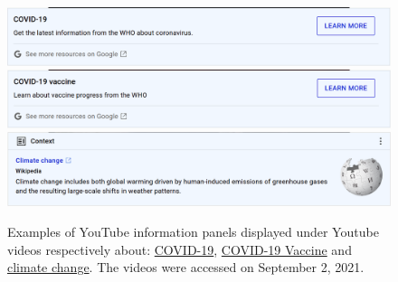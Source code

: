 \documentclass{article}
\begin{document}
\begin{figure}[h]
	\centering
		\includegraphics[scale=0.2]{./img/youtube_panels/youtube_panel_covid.png} 
		\includegraphics[scale=0.2]{./img/youtube_panels/youtube_panel_covid_vaccine.png} 
		\includegraphics[scale=0.2]{./img/youtube_panels/youtube_panel_climate.png}
	\caption{Examples of YouTube information panels displayed under Youtube videos respectively about: \href{https://www.youtube.com/watch?v=O1cFVdC2rZQ}{COVID-19}, \href{https://www.youtube.com/watch?v=v0-6JTr2Ifo}{COVID-19 Vaccine} and \href{https://www.youtube.com/watch?v=4U8kgiiVj5Q}{climate change}. The videos were accessed on September 2, 2021.}
	\label{youtube_panel_screenshots}
\end{figure}

\end{document}
